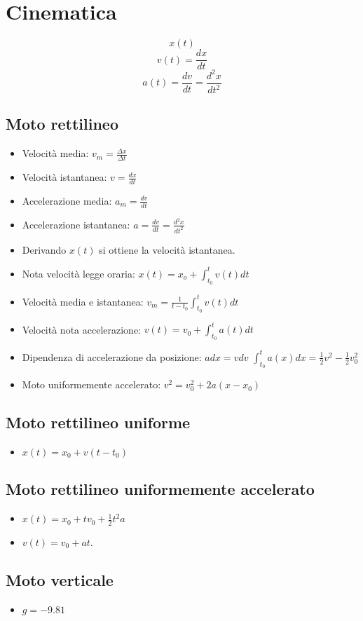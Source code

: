 \section{Cinematica}
$$x(t)$$
$$v(t) = \frac{dx}{dt}$$
$$a(t) = \frac{dv}{dt} = \frac{d^2x}{dt^2}$$
	\subsection{Moto rettilineo}
	\begin{itemize}
		\item Velocit\`a media: $v_m = \frac{\Delta x}{\Delta t}$
		\item Velocit\`a istantanea: $v = \frac{dx}{dt}$
		\item Accelerazione media: $a_m = \frac{dv}{dt}$
		\item Accelerazione istantanea: $a = \frac{dv}{dt}=\frac{d^2x}{dt^2}$
		\item Derivando $x(t)$ si ottiene la velocit\`a istantanea.
		\item Nota velocit\`a legge oraria: $x(t) = x_o + \int_{t_0}^{t}v(t)dt$
		\item Velocit\`a media e istantanea: $v_m = \frac{1}{t-t_0}\int_{t_0}^t v(t)dt$
		\item Velocit\`a nota accelerazione: $v(t) = v_0+\int_{t_0}^t a(t)dt$
		\item Dipendenza di accelerazione da posizione: $adx =vdv$ $\int_{t_0}^t a(x)dx = \frac{1}{2}v^2-\frac{1}{2}v_0^2$
		\item Moto uniformemente accelerato: $v^2 = v_0^2 + 2a(x-x_0)$
	\end{itemize}
	\subsection{Moto rettilineo uniforme}
	\begin{itemize}
		\item $x(t) = x_0 + v(t-t_0)$
	\end{itemize}
	\subsection{Moto rettilineo uniformemente accelerato}
	\begin{itemize}
		\item $x(t) = x_0 + tv_0 + \frac{1}{2}t^2a$
		\item $v(t) = v_0+at$.
	\end{itemize}
	\subsection{Moto verticale}
	\begin{itemize}
		\item $g=-9.81$
	\end{itemize}
